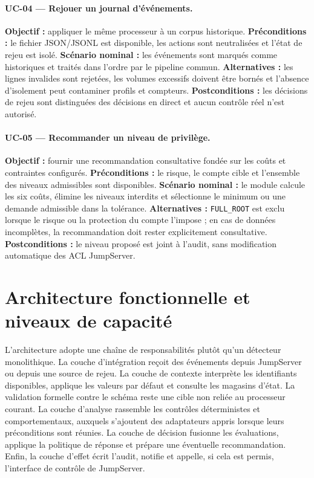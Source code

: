 \documentclass[11pt,a4paper,oneside]{report}
\theoremstyle{definition}
\theoremstyle{plain}
\begin{document}
\paragraph{UC-04 --- Rejouer un journal d'événements.}
\textbf{Objectif :} appliquer le même processeur à un corpus historique.
\textbf{Préconditions :} le fichier JSON/JSONL est disponible, les actions sont
neutralisées et l'état de rejeu est isolé. \textbf{Scénario nominal :} les
événements sont marqués comme historiques et traités dans l'ordre par le
pipeline commun. \textbf{Alternatives :} les lignes invalides sont rejetées,
les volumes excessifs doivent être bornés et l'absence d'isolement peut
contaminer profils et compteurs. \textbf{Postconditions :} les décisions de
rejeu sont distinguées des décisions en direct et aucun contrôle réel n'est
autorisé.

\paragraph{UC-05 --- Recommander un niveau de privilège.}
\textbf{Objectif :} fournir une recommandation consultative fondée sur les
coûts et contraintes configurés. \textbf{Préconditions :} le risque, le compte
cible et l'ensemble des niveaux admissibles sont disponibles.
\textbf{Scénario nominal :} le module calcule les six coûts, élimine les
niveaux interdits et sélectionne le minimum ou une demande admissible dans la
tolérance. \textbf{Alternatives :} \texttt{FULL\_ROOT} est exclu lorsque le
risque ou la protection du compte l'impose ; en cas de données incomplètes, la
recommandation doit rester explicitement consultative.
\textbf{Postconditions :} le niveau proposé est joint à l'audit, sans
modification automatique des ACL JumpServer.

\label{tab:impl-use-cases-summary}

\section{Architecture fonctionnelle et niveaux de capacité}

L'architecture adopte une chaîne de responsabilités plutôt qu'un détecteur
monolithique. La couche d'intégration reçoit des événements depuis JumpServer
ou depuis une source de rejeu. La couche de contexte interprète les identifiants
disponibles, applique les valeurs par défaut et consulte les magasins d'état.
La validation formelle contre le schéma reste une cible non reliée au
processeur courant. La couche
d'analyse rassemble les contrôles déterministes et comportementaux, auxquels
s'ajoutent des adaptateurs appris lorsque leurs préconditions sont réunies. La
couche de décision fusionne les évaluations, applique la politique de réponse
et prépare une éventuelle recommandation. Enfin, la couche d'effet écrit
l'audit, notifie et appelle, si cela est permis, l'interface de contrôle de
JumpServer.
\end{document}

